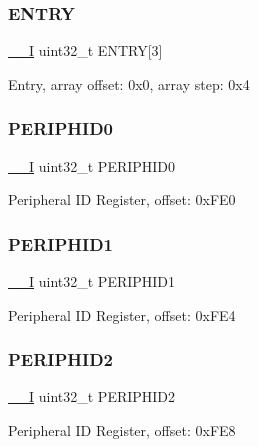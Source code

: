 \subsubsection{\texorpdfstring{ENTRY}{ENTRY}}
{\footnotesize\ttfamily \mbox{\hyperlink{core__cm0plus_8h_af63697ed9952cc71e1225efe205f6cd3}{\+\_\+\+\_\+I}} uint32\+\_\+t E\+N\+T\+RY\mbox{[}3\mbox{]}}

Entry, array offset\+: 0x0, array step\+: 0x4 \mbox{\label{struct_r_o_m___type_abccabeeb775d571ffd814f5d21937eab}} 
\subsubsection{\texorpdfstring{PERIPHID0}{PERIPHID0}}
{\footnotesize\ttfamily \mbox{\hyperlink{core__cm0plus_8h_af63697ed9952cc71e1225efe205f6cd3}{\+\_\+\+\_\+I}} uint32\+\_\+t P\+E\+R\+I\+P\+H\+I\+D0}

Peripheral ID Register, offset\+: 0x\+F\+E0 \mbox{\label{struct_r_o_m___type_a16ec4a15479493f070d74c29f4e244c5}} 
\subsubsection{\texorpdfstring{PERIPHID1}{PERIPHID1}}
{\footnotesize\ttfamily \mbox{\hyperlink{core__cm0plus_8h_af63697ed9952cc71e1225efe205f6cd3}{\+\_\+\+\_\+I}} uint32\+\_\+t P\+E\+R\+I\+P\+H\+I\+D1}

Peripheral ID Register, offset\+: 0x\+F\+E4 \mbox{\label{struct_r_o_m___type_a94da77c610b86d788d32cc8cb6871d23}} 
\subsubsection{\texorpdfstring{PERIPHID2}{PERIPHID2}}
{\footnotesize\ttfamily \mbox{\hyperlink{core__cm0plus_8h_af63697ed9952cc71e1225efe205f6cd3}{\+\_\+\+\_\+I}} uint32\+\_\+t P\+E\+R\+I\+P\+H\+I\+D2}

Peripheral ID Register, offset\+: 0x\+F\+E8 \mbox{\label{struct_r_o_m___type_a9ebff4a243ecc983d7f4de875b7669d6}} 
